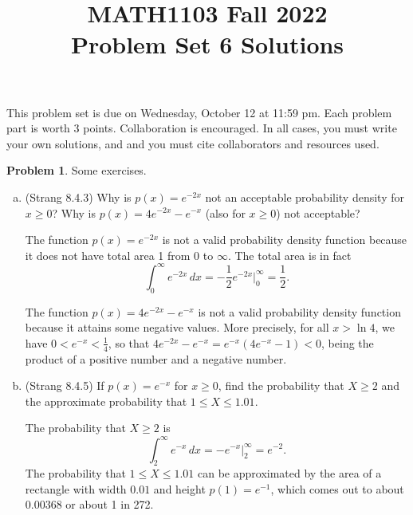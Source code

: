 \documentclass[11pt,oneside]{amsart}
\title{MATH1103 Fall 2022\\
Problem Set 6 Solutions}
\theoremstyle{definition}
\newtheorem{problem}{Problem}
\begin{document}
    \maketitle
    This problem set is due on Wednesday, October 12 at 11:59 pm. Each problem part is worth 3 points. Collaboration is encouraged. In all cases, you must write your own solutions, and and you must cite collaborators and resources used.

    \begin{problem}
        Some exercises.
        \begin{enumerate}[(a)]
            \item (Strang 8.4.3) Why is $p(x)=e^{-2x}$ not an acceptable probability density for $x\geq 0$? Why is $p(x)=4e^{-2x}-e^{-x}$ (also for $x\geq 0$) not acceptable?
            \begin{solution}
                The function $p(x)=e^{-2x}$ is not a valid probability density function because it does not have total area 1 from 0 to $\infty$. The total area is in fact
                \[\int_0^\infty e^{-2x}\,dx=-\frac 12e^{-2x}\Big|_0^\infty=\frac12.\]

                The function $p(x)=4e^{-2x}-e^{-x}$ is not a valid probability density function because it attains some negative values. More precisely, for all $x>\ln 4$, we have $0<e^{-x}<\frac 14$, so that $4e^{-2x}-e^{-x}=e^{-x}(4e^{-x}-1)<0$, being the product of a positive number and a negative number.
            \end{solution}
            \item (Strang 8.4.5) If $p(x)=e^{-x}$ for $x\geq 0$, find the probability that $X\geq 2$ and the approximate probability that $1\leq X\leq 1.01$.
            \begin{solution}
                The probability that $X\geq 2$ is
                \[\int_2^\infty e^{-x}\,dx=-e^{-x}\Big|_2^\infty=e^{-2}.\]
                The probability that $1\leq X\leq 1.01$ can be approximated by the area of a rectangle with width $0.01$ and height $p(1)=e^{-1}$, which comes out to about $0.00368$ or about 1 in 272.


\end{solution}
\end{enumerate}
\end{problem}
\end{document}
